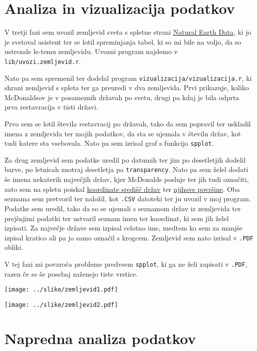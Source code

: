 \documentclass[11pt,a4paper]{article}
\begin{document}
\newpage

\section{Analiza in vizualizacija podatkov}


V tretji fazi sem uvozil zemljevid sveta s spletne strani \href{http://www.naturalearthdata.com/http//www.naturalearthdata.com/download/50m/cultural/ne_50m_admin_0_countries.zip}{Natural Earth Data}, ki jo je svetoval asistent ter se lotil spreminjanja tabel, ki so mi bile na voljo, da so ustrezale le-temu zemljevidu. Uvozni program najdemo v \verb|lib/uvozi.zemljevid.r|. \par

Nato pa sem spremenil ter dodelal program \verb|vizualizacija/vizualizacija.r|, ki shrani zemljevid s spleta ter ga preuredi v dva zemljevida. Prvi prikazuje, koliko McDonaldsov je v posameznih državah po svetu, drugi pa kdaj je bila odprta prva restavracija v tisti državi.

Prvo sem se lotil števila restavracij po državah, tako da sem popravil ter uskladil imena z zemljevida ter mojih podatkov, da sta se ujemala v številu držav, kot tudi katere sta vsebovala. Nato pa sem izrisal graf s funkcijo \verb|spplot|. \par

Za drug zemljevid sem podatke uredil po datumih ter jim po desetletjih dodelil barve, po letnicah znotraj desetletja pa \verb|transparency|. Nato pa sem želel dodati še imena nekaterih največjih držav, kjer McDonalds posluje ter jih tudi označiti, zato sem na spletu poiskal \href{https://developers.google.com/public-data/docs/canonical/countries_csv}{koordinate središč držav} ter \href{http://simple.wikipedia.org/wiki/List_of_countries_by_area}{njihove površine}. Oba seznama sem pretvoril ter naložil, kot \verb|.CSV| datoteki ter ju uvozil v moj program. Podatke sem uredil, tako da so se ujemali s seznamom držav iz zemljevida ter prejšnjimi podatki ter ustvaril seznam imen ter koordinat, ki sem jih želel izpisati. Za največje države sem izpisal celotno ime, medtem ko sem za manjše izpisal kratico ali pa jo samo označil s krogcem. Zemljevid sem nato izrisal v \verb|.PDF| obliki. \par

V tej fazi mi povzroča probleme predvsem \verb|spplot|, ki ga ne želi zapisati v \verb|.PDF|, razen če se še posebaj zaženejo tiste vrstice. \newpage

\begin{sidewaysfigure}[ht]
	\texttt{[image: ../slike/zemljevid1.pdf]}
\end{sidewaysfigure}


\begin{sidewaysfigure}[ht]
	\texttt{[image: ../slike/zemljevid2.pdf]}
\end{sidewaysfigure}

\newpage

\section{Napredna analiza podatkov}
\end{document}
